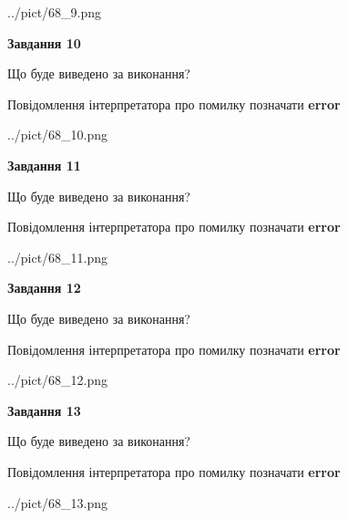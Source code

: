 \documentclass[11pt, ukrainian]{article}
\begin{document}
{\begin {large}
\begin{center}
	{../pict/68_9.png}
\end{center}
\newpage

{\begin {center}\textbf{Завдання 10}\end {center}}\par
Що буде виведено за виконання? \par
Повідомлення інтерпретатора про помилку позначати \textbf{error}

\begin{center}
	{../pict/68_10.png}
\end{center}
\newpage

{\begin {center}\textbf{Завдання 11}\end {center}}\par
Що буде виведено за виконання? \par
Повідомлення інтерпретатора про помилку позначати \textbf{error}

\begin{center}
	{../pict/68_11.png}
\end{center}
\newpage

{\begin {center}\textbf{Завдання 12}\end {center}}\par
Що буде виведено за виконання? \par
Повідомлення інтерпретатора про помилку позначати \textbf{error}

\begin{center}
	{../pict/68_12.png}
\end{center}
\newpage

{\begin {center}\textbf{Завдання 13}\end {center}}\par
Що буде виведено за виконання? \par
Повідомлення інтерпретатора про помилку позначати \textbf{error}

\begin{center}
	{../pict/68_13.png}
\end{center}
\newpage


\end{large}}
\end{document}
